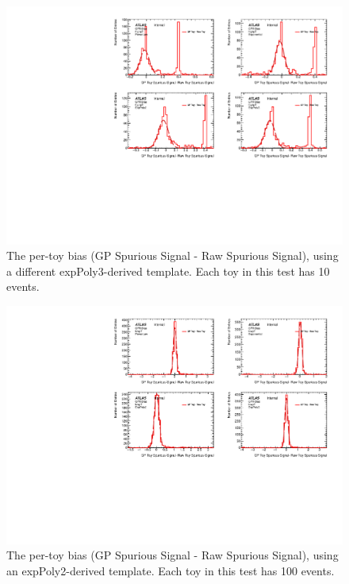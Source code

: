 \begin{figure} 
\begin{center}
  \includegraphics[width=\textwidth]{figures/background/gpr/validation/nominal/ToyTest_FitSigBiases_highpT_10_noSig}   
\caption{The per-toy bias (GP Spurious Signal - Raw Spurious Signal), using a different expPoly3-derived template. Each toy in this test has 10 events.}
\label{fig:bias_highpt_10_noSig}
\end{center}
\end{figure}

\begin{figure} 
\begin{center}
  \includegraphics[width=\textwidth]{figures/background/gpr/validation/nominal/ToyTest_FitSigBiases_lowpT_100_noSig}   
\caption{The per-toy bias (GP Spurious Signal - Raw Spurious Signal), using an expPoly2-derived template. Each toy in this test has 100 events.}
\label{fig:bias_lowpt_100_noSig}
\end{center}
\end{figure}

